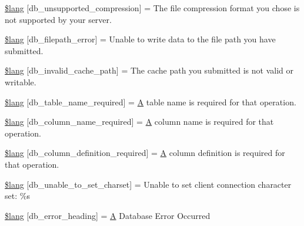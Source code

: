 \begin{DoxyCompactItemize}
\item 
\mbox{\hyperlink{db__lang_8php_a5537af909553ea18053324d63154b49f}{\$lang}} \mbox{[}\textquotesingle{}db\+\_\+unsupported\+\_\+compression\textquotesingle{}\mbox{]} = \textquotesingle{}The file compression format you chose is not supported by your server.\textquotesingle{}
\item 
\mbox{\hyperlink{db__lang_8php_ab7a05ad84cc1f2f472051d11e1efbcc7}{\$lang}} \mbox{[}\textquotesingle{}db\+\_\+filepath\+\_\+error\textquotesingle{}\mbox{]} = \textquotesingle{}Unable to write data to the file path you have submitted.\textquotesingle{}
\item 
\mbox{\hyperlink{db__lang_8php_acf5030041eda6a044c1bb74164cca4ec}{\$lang}} \mbox{[}\textquotesingle{}db\+\_\+invalid\+\_\+cache\+\_\+path\textquotesingle{}\mbox{]} = \textquotesingle{}The cache path you submitted is not valid or writable.\textquotesingle{}
\item 
\mbox{\hyperlink{db__lang_8php_a76120f724a53ceed19f7bcfe5ed19381}{\$lang}} \mbox{[}\textquotesingle{}db\+\_\+table\+\_\+name\+\_\+required\textquotesingle{}\mbox{]} = \textquotesingle{}\mbox{\hyperlink{class_a}{A}} table name is required for that operation.\textquotesingle{}
\item 
\mbox{\hyperlink{db__lang_8php_a583750655109a685fadc9326b2f50d59}{\$lang}} \mbox{[}\textquotesingle{}db\+\_\+column\+\_\+name\+\_\+required\textquotesingle{}\mbox{]} = \textquotesingle{}\mbox{\hyperlink{class_a}{A}} column name is required for that operation.\textquotesingle{}
\item 
\mbox{\hyperlink{db__lang_8php_aba66a7f1d6d0e96b1f38df5af45ad905}{\$lang}} \mbox{[}\textquotesingle{}db\+\_\+column\+\_\+definition\+\_\+required\textquotesingle{}\mbox{]} = \textquotesingle{}\mbox{\hyperlink{class_a}{A}} column definition is required for that operation.\textquotesingle{}
\item 
\mbox{\hyperlink{db__lang_8php_a0bcbe4b38afeeecc1015d4dab23d2e80}{\$lang}} \mbox{[}\textquotesingle{}db\+\_\+unable\+\_\+to\+\_\+set\+\_\+charset\textquotesingle{}\mbox{]} = \textquotesingle{}Unable to set client connection character set\+: \%s\textquotesingle{}
\item 
\mbox{\hyperlink{db__lang_8php_ac5073170f6cb2a17aeaf0d2e9f7c070a}{\$lang}} \mbox{[}\textquotesingle{}db\+\_\+error\+\_\+heading\textquotesingle{}\mbox{]} = \textquotesingle{}\mbox{\hyperlink{class_a}{A}} Database Error Occurred\textquotesingle{}
\end{DoxyCompactItemize}


